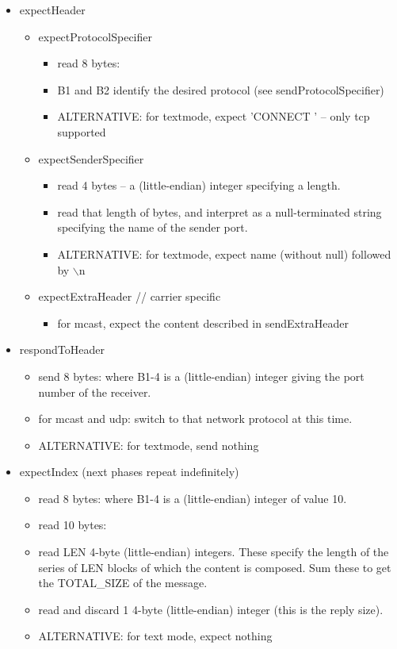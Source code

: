 \begin{itemize}
\item expectHeader
  
  \begin{itemize}
  \item expectProtocolSpecifier
    \begin{itemize}
    \item read 8 bytes: 
    \item B1 and B2 identify the desired protocol (see sendProtocolSpecifier)
    \item ALTERNATIVE: for textmode, expect 'CONNECT ' -- only tcp supported
    \end{itemize}

  \item expectSenderSpecifier
    \begin{itemize}
    \item read 4 bytes -- a (little-endian) integer specifying a length.
    \item read that length of bytes, and interpret as a null-terminated
      string specifying the name of the sender port.
    \item ALTERNATIVE: for textmode, expect name (without null) followed by $\backslash$n
    \end{itemize}

  \item expectExtraHeader        // carrier specific
    \begin{itemize}
    \item for mcast, expect the content described in sendExtraHeader
    \end{itemize}
  \end{itemize}

\item respondToHeader
  \begin{itemize}
  \item send 8 bytes:  where B1-4 is a 
    (little-endian) integer giving the port number of the receiver.
  \item for mcast and udp: switch to that network protocol at this time.
  \item ALTERNATIVE: for textmode, send nothing
  \end{itemize}

\item expectIndex (next phases repeat indefinitely)
  \begin{itemize}
  \item read 8 bytes:  where B1-4 is a 
    (little-endian) integer of value 10.
  \item read 10 bytes: 
  \item read LEN 4-byte (little-endian) integers.  These specify
    the length of the series of LEN blocks of which the
    content is composed.  Sum these to get the TOTAL\_SIZE of the 
    message.
  \item read and discard 1 4-byte (little-endian) integer (this is
    the reply size).
  \item ALTERNATIVE: for text mode, expect nothing
  \end{itemize}


\end{itemize}
